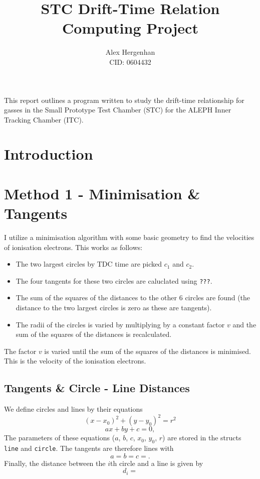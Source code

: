 \documentclass[11pt]{article}
\begin{document}
\title{STC Drift-Time Relation\\\normalsize Computing Project}
\author{Alex Hergenhan\\CID: 0604432}
\maketitle

This report outlines a program written to study the drift-time relationship for gasses in the Small Prototype Test Chamber (STC) for the ALEPH Inner Tracking Chamber (ITC).

\section{Introduction}
\label{sec:intro}

\section{Method 1 - Minimisation \& Tangents}
\label{sec:method}
I utilize a minimisation algorithm with some basic geometry to find the velocities of ionisation electrons. This works as follows:
\begin{itemize}
    \item The two largest circles by TDC time are picked $c_1$ and $c_2$.
    \item The four tangents for these two circles are caluclated using \texttt{???}.
    \item The sum of the squares of the distances to the other 6 circles are found (the distance to the two largest circles is zero as these are tangents).
    \item The radii of the circles is varied by multiplying by a constant factor $v$ and the sum of the squares of the distances is recalculated.
\end{itemize}
The factor $v$ is varied until the sum of the squares of the distances is minimised. This is the velocity of the ionisation electrons.

\subsection{Tangents \& Circle - Line Distances}
\label{sec:tangents}
We define circles and lines by their equations
\begin{equation}
    (x - x_0)^2 + (y - y_0)^2 = r^2
    \label{eq:circle}
\end{equation}
\begin{equation}
    ax + by + c = 0,
    \label{eq:line}
\end{equation}
The parameters of these equations ($a$, $b$, $c$, $x_0$, $y_0$, $r$) are stored in the structs \texttt{line} and \texttt{circle}. The tangents are therefore lines with
\begin{equation}
    a = 
    b = 
    c = .
    \label{eq:tangents}
\end{equation}
Finally, the distance between the $i$th circle and a line is given by
\begin{equation}
    d_i = 
    \label{eq:dist}
\end{equation}
\end{document}
